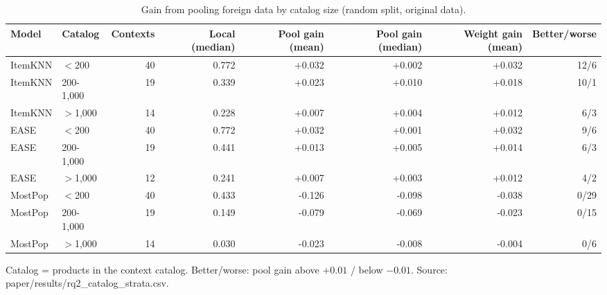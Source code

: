 \begin{table}[H]
\footnotesize
\caption{Gain from pooling foreign data by catalog size (random split, original data).\label{tab:strata}}
\centering
\begin{tabular}{llrrrrrr}
\toprule
Model & Catalog & Contexts & Local (median) & Pool gain (mean) & Pool gain (median) & Weight gain (mean) & Better/worse \\
\midrule
ItemKNN & $<$200 & 40 & 0.772 & +0.032 & +0.002 & +0.032 & 12/6 \\
ItemKNN & 200-1,000 & 19 & 0.339 & +0.023 & +0.010 & +0.018 & 10/1 \\
ItemKNN & $>$1,000 & 14 & 0.228 & +0.007 & +0.004 & +0.012 & 6/3 \\
EASE & $<$200 & 40 & 0.772 & +0.032 & +0.001 & +0.032 & 9/6 \\
EASE & 200-1,000 & 19 & 0.441 & +0.013 & +0.005 & +0.014 & 6/3 \\
EASE & $>$1,000 & 12 & 0.241 & +0.007 & +0.003 & +0.012 & 4/2 \\
MostPop & $<$200 & 40 & 0.433 & -0.126 & -0.098 & -0.038 & 0/29 \\
MostPop & 200-1,000 & 19 & 0.149 & -0.079 & -0.069 & -0.023 & 0/15 \\
MostPop & $>$1,000 & 14 & 0.030 & -0.023 & -0.008 & -0.004 & 0/6 \\
\bottomrule
\end{tabular}
\par\footnotesize Catalog = products in the context catalog. Better/worse: pool gain above $+0.01$ / below $-0.01$. Source: paper/results/rq2\_catalog\_strata.csv.
\end{table}
